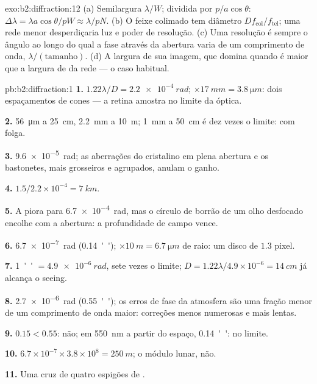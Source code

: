\begin{solution}{exo:b2:diffraction:12}
(a) Semilargura $\lambda/W$; dividida por $p/a\cos\theta$: $\Delta\lambda = \lambda a\cos\theta/pW \approx
\lambda/pN$. (b) O feixe colimado tem diâmetro $Df_{\text{col}}/f_{\text{tel}}$;
uma rede menor desperdiçaria luz e poder de resolução. (c) Uma
resolução é sempre o ângulo ao longo do qual a fase através da
abertura varia de um comprimento de onda, $\lambda/(\text{tamanho})$. (d) A largura de
sua imagem, que domina quando é maior que a largura de  da
rede --- o caso habitual.
\end{solution}

\begin{solution}{pb:b2:diffraction:1}
\textbf{1.} $1.22\lambda/D = \qty{2.2e-4}{rad}$; $\times\qty{17}{mm} = \qty{3.8}{\micro m}$: dois
espaçamentos de cones --- a retina amostra no limite da óptica.

\textbf{2.} \qty{56}{\micro m} a \qty{25}{cm}, \qty{2.2}{mm} a \qty{10}{m}; \qty{1}{mm} a
\qty{50}{cm} é dez vezes o limite: com folga.

\textbf{3.} \qty{9.6e-5}{rad}; as aberrações do cristalino em plena abertura e os
bastonetes, mais grosseiros e agrupados, anulam o ganho.

\textbf{4.} $1.5/2.2 \times 10^{-4} = \qty{7}{km}$.

\textbf{5.} A  piora para \qty{6.7e-4}{rad}, mas o círculo de borrão de
um olho desfocado encolhe com a abertura: a profundidade de campo vence.

\textbf{6.} \qty{6.7e-7}{rad} (\qty{0.14}{''}); $\times\qty{10}{m} = \qty{6.7}{\micro m}$ de raio: um
disco de $1.3$ pixel.

\textbf{7.} \qty{1}{''} $= \qty{4.9e-6}{rad}$, sete vezes o limite; $D = 1.22\lambda/4.9
\times 10^{-6} = \qty{14}{cm}$ já alcança o seeing.

\textbf{8.} \qty{2.7e-6}{rad} (\qty{0.55}{''}); os erros de fase da atmosfera são
uma fração menor de um comprimento de onda maior: correções menos numerosas e mais lentas.

\textbf{9.} $0.15 < 0.55$: não; em \qty{550}{nm} a partir do espaço, \qty{0.14}{''}: no limite.

\textbf{10.} $6.7 \times 10^{-7} \times 3.8 \times 10^8 = \qty{250}{m}$; o módulo lunar, não.

\textbf{11.} Uma cruz de quatro espigões de .


\end{solution}
